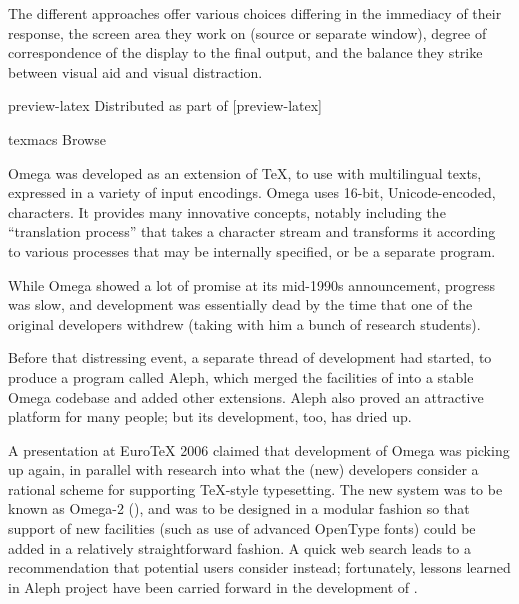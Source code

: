 The different approaches offer various choices differing in the
immediacy of their response, the screen area they work on (source or
separate window), degree of correspondence of the display to the final
output, and the balance they strike between visual aid and visual
distraction.
\begin{ctanrefs}
\item[preview-latex]Distributed as part of [preview-latex]
\item[texmacs]Browse 
\end{ctanrefs}


Omega\nothtml{ (\ensuremath{\Omega})} was developed as an extension of
\TeX{}, to use with multilingual texts, expressed in a variety of
input encodings.  Omega uses 16-bit, Unicode-encoded, characters.  It
provides many innovative concepts, notably including the ``translation
process'' that takes a character stream and transforms it according to
various processes that may be internally specified, or be a separate
program.

While Omega showed a lot of promise at its mid-1990s announcement,
progress was slow, and development was essentially dead by the time
that one of the original developers withdrew (taking with him a bunch
of research students).

Before that distressing event, a separate thread of development had
started, to produce a program %
called Aleph\nothtml{ (\ensuremath{\aleph})}, which merged the facilities of
 into a stable Omega codebase and added other
extensions.  Aleph also proved an attractive platform for many people;
but its development, too, has dried up.

A presentation at Euro\TeX{} 2006 claimed that development of Omega
was picking up again, in parallel with research into what the (new)
developers consider a rational scheme for supporting \TeX{}-style
typesetting.  The new system was to be known as Omega-2
(), and was to be
designed in a modular fashion so that support of new facilities (such
as use of advanced OpenType fonts) could be added in a relatively
straightforward fashion.  A quick web search leads to a recommendation
that potential users consider  instead;
fortunately, lessons learned in Aleph project have been carried
forward in the development of \luatex{}.

